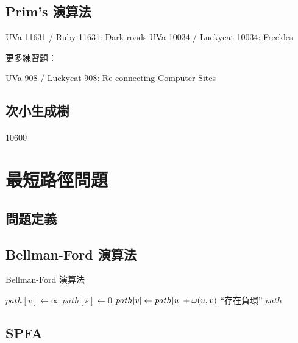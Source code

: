 \documentclass[12pt,a4paper,oneside]{report}
\begin{document}
\begin{CJK}{UTF8}{bkai}
\subsection{Prim's 演算法}

UVa 11631 / Ruby 11631: Dark roads
UVa 10034 / Luckycat 10034: Freckles

更多練習題：

UVa 908 / Luckycat 908: Re-connecting Computer Sites

\subsection{次小生成樹}
\paragraph{}10600

\section{最短路徑問題}
\subsection{問題定義}
\subsection{Bellman-Ford 演算法}

\begin{algorithm}
\caption{Bellman-Ford 演算法}
\label{algo:shortest_path_bellman_ford}
\begin{algorithmic}[1]
  \State{}
    \State $path[v]\gets\infty$
  \EndFor
  \State $path[s]\gets{0}$
        \State $path[v]\gets{path[u]+\omega{\ensuremath{({u},{v})}}}$
      \EndIf
    \EndFor
  \EndFor
      \State \Return ``存在負環''
    \EndIf
  \EndFor
  \State \Return $path$
\EndProcedure
\end{algorithmic}
\end{algorithm}

\subsection{SPFA}

\end{CJK}
\end{document}
